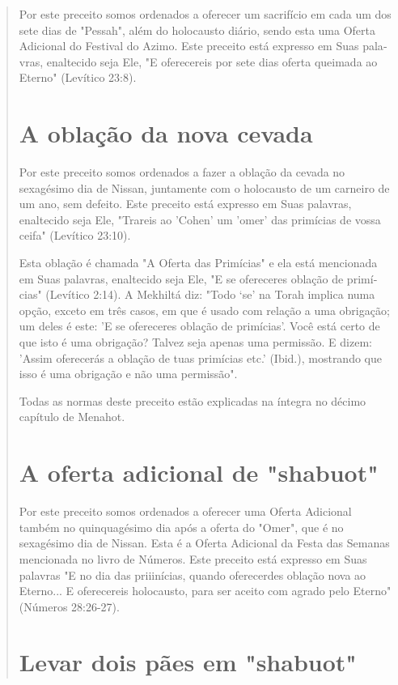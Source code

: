 \begin{quote}
Por este preceito somos ordenados a oferecer um sacrifício em cada um
dos sete dias de "Pessah", além do holocausto diário, sendo esta uma
Ofer­ta Adicional do Festival do Azimo. Este preceito está expresso em
Suas pala­vras, enaltecido seja Ele, "E oferecereis por sete dias oferta
queimada ao Eter­no" (Levítico 23:8).

\section{A oblação da nova cevada}

Por este preceito somos ordenados a fazer a oblação da cevada no
sexagésimo dia de Nissan, juntamente com o holocausto de um carneiro de
um ano, sem defeito. Este preceito está expresso em Suas palavras,
enaltecido seja Ele, "Trareis ao 'Cohen' um 'omer' das primícias de
vossa ceifa" (Levítico 23:10).

Esta oblação é chamada "A Oferta das Primícias" e ela está mencio­nada
em Suas palavras, enaltecido seja Ele, "E se ofereceres oblação de
primí­cias" (Levítico 2:14). A Mekhiltá diz: "Todo `se' na Torah implica
numa opção, exceto em três casos, em que é usado com relação a uma
obrigação; um deles é este: 'E se ofereceres oblação de primícias'. Você
está certo de que isto é uma obrigação? Talvez seja apenas uma
permissão. E dizem: 'Assim oferecerás a obla­ção de tuas primícias etc.'
(Ibid.), mostrando que isso é uma obrigação e não uma permissão".

Todas as normas deste preceito estão explicadas na íntegra no déci­mo
capítulo de Menahot.

\section{A oferta adicional de "shabuot"}

Por este preceito somos ordenados a oferecer uma Oferta Adicional também
no quinquagésimo dia após a oferta do "Omer", que é no sexagésimo dia de
Nissan. Esta é a Oferta Adicional da Festa das Semanas mencionada no
livro de Números. Este preceito está expresso em Suas palavras "E no dia
das priiinícias, quando oferecerdes oblação nova ao Eterno... E
oferecereis holocaus­to, para ser aceito com agrado pelo Eterno"
(Números 28:26-27).

\section{Levar dois pães em "shabuot"}


\end{quote}
